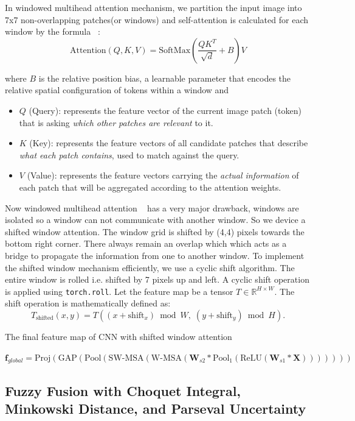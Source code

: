 \documentclass[preprint,12pt]{elsarticle}
\begin{document}
In windowed multihead attention mechanism, we partition the input image into 7x7 non-overlapping patches(or windows) and self-attention is calculated for each window by the formula ~\cite{b5}:
\[
\text{Attention}(Q, K, V) 
= \text{SoftMax}\left(\frac{QK^{T}}{\sqrt{d}} + B \right) V
\]

where $B$ is the relative position bias, a learnable parameter that encodes the relative spatial configuration of tokens within a window and
\begin{itemize}
\item $Q$ (Query): represents the feature vector of the current image patch (token) that is asking \emph{which other patches are relevant} to it.
\item $K$ (Key): represents the feature vectors of all candidate patches that describe \emph{what each patch contains}, used to match against the query.
\item $V$ (Value): represents the feature vectors carrying the \emph{actual information} of each patch that will be aggregated according to the attention weights.
\end{itemize}

Now windowed multihead attention ~\cite{b4} has a very major drawback, windows are isolated so a window can not communicate with another window. So we device a shifted window attention. The window grid is shifted by (4,4) pixels towards the bottom right corner. There always remain an overlap which which acts as a bridge to propagate the information from one to another window. To implement the shifted window mechanism efficiently, we use a cyclic shift algorithm. The entire window is rolled i.e. shifted by 7 pixels up and left. 
A cyclic shift operation is applied using \texttt{torch.roll}.  
Let the feature map be a tensor $T \in \mathbb{R}^{H \times W}$.  
The shift operation is mathematically defined as:
\[
T_{\text{shifted}}(x, y)
=
T\!\left( (x + \text{shift}_x) \bmod W,\; (y + \text{shift}_y) \bmod H \right).
\]

The final feature map of CNN with shifted window attention

$\mathbf{f}_{global} = \mathrm{Proj}(\mathrm{GAP}(\mathrm{Pool}(\mathrm{SW\text{-}MSA}(\mathrm{W\text{-}MSA}(\mathbf{W}_{s2} * \mathrm{Pool}_1(\mathrm{ReLU}(\mathbf{W}_{s1} * \mathbf{X})))))))$


\subsection{Fuzzy Fusion with Choquet Integral, Minkowski Distance, and Parseval Uncertainty}
\end{document}
